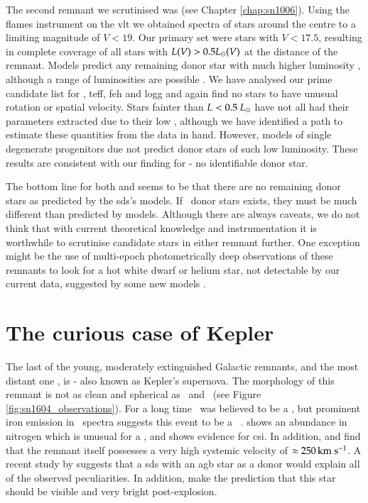 The second remnant we scrutinised was  (see Chapter \ref{chap:sn1006}). Using the \gls{flames} instrument on the \gls{vlt} we obtained spectra of stars around the centre to a limiting magnitude of $V<19$. Our primary set were stars with $V<17.5$, resulting in complete coverage of all stars with $L(V) > 0.5\hbox{$L_{\odot}$}(V)$ at the distance of the remnant. Models predict any remaining \gls*{donor} star with much higher luminosity \cite[10--100\lsun][]{2000ApJS..128..615M}, although a range of luminosities are possible \citep{2003astro.ph..3660P}. 
We have analysed our prime candidate list for \vrot, \gls{teff}, \gls{feh} and \gls{logg} and again find no stars to have unusual rotation or spatial velocity. Stars fainter than $L < 0.5~\hbox{$L_{\odot}$}$ have not all had their parameters extracted due to their low \snratio, although we have identified a path to estimate these quantities from the data in hand. However, models of single degenerate progenitors due not predict donor stars of such low luminosity. These results are consistent with our finding for  - no identifiable \gls*{donor} star. 

The bottom line for both  and  seems to be that there are no remaining donor stars as predicted by the \gls{sds}'s models. If \snia\ \gls*{donor} stars exists, they must be much different than predicted by models. Although there are always caveats, we do not think that with current theoretical knowledge and instrumentation it is worthwhile to scrutinise candidate stars in either remnant further. One exception might be the use of multi-epoch photometrically deep observations of these remnants to look for a hot white dwarf or helium star, not detectable by our current data, suggested by some new models \citep[e.g.][]{2010A&A...514A..53F}. 

\section{The curious case of Kepler}
The last of the young, moderately extinguished Galactic remnants, and the most distant one \citep[][estimates a distance of $\ge 6$\,\kpc]{2008ApJ...689..231V}, is  - also known as Kepler's supernova.  The morphology of this remnant is not as clean and spherical as \ and \ (see Figure \ref{fig:sn1604_observations}). For a long time \ was believed to be a \snib, but prominent iron emission in \xray\ spectra \citep{2007ApJ...668L.135R} suggests this event to be a \snia\ \citep{1995ApJ...444L..81H}.  shows an abundance in nitrogen which is unusual for a \snia, and shows evidence for \gls{csi}. In addition, \citet{1991ApJ...366..484B} and \citet{2003A&A...407..249S} find that the remnant itself possesses a very high systemic velocity of  $\approx 250\,\textrm{km}~\textrm{s}^{-1}$. A recent study by \citet{2011arXiv1103.5487C} suggests that a \gls{sds} with an \gls{agb} star as a \gls*{donor} would explain all of the observed peculiarities. In addition, \citet{2011arXiv1103.5487C} make the prediction that this star should be visible and very bright post-explosion. 

